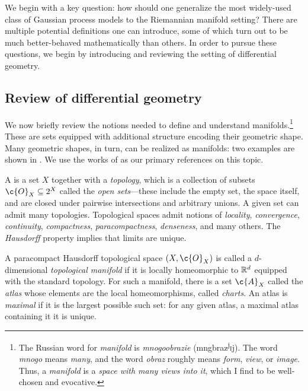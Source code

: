 \documentclass[11pt]{book}
\begin{document}
We begin with a key question: how should one generalize the most widely-used class of Gaussian process models to the Riemannian manifold setting?
There are multiple potential definitions one can introduce, some of which turn out to be much better-behaved mathematically than others.
In order to pursue these questions, we begin by introducing and reviewing the setting of differential geometry.

\subsection{Review of differential geometry}
We now briefly review the notions needed to define and understand manifolds.\footnote{The Russian word for \emph{manifold} is \emph{mnogoobrazie} (mngbr{\textquotesingle}az\textsuperscript{j}\textsc{i}j). The word \emph{mnogo} means \emph{many}, and the word \emph{obraz} roughly means \emph{form}, \emph{view}, or \emph{image}. 
Thus, a \emph{manifold} is a \emph{space with many views into it}, which I find to be well-chosen and evocative.}
These are sets equipped with additional structure encoding their geometric shape.
Many geometric shapes, in turn, can be realized as manifolds: two examples are shown in .
We use the works of \textcite{lee10,lee12,lee18} as our primary references on this topic.

A  is a set $X$ together with a \emph{topology}, which is a collection of subsets $\c{O}_X \subseteq 2^X$ called the \emph{open sets}---these include the empty set, the space itself, and are closed under pairwise intersections and arbitrary unions.
A given set can admit many topologies.
Topological spaces admit notions of \emph{locality}, \emph{convergence}, \emph{continuity}, \emph{compactness}, \emph{paracompactness}, \emph{denseness}, and many others.
The \emph{Hausdorff} property implies that limits are unique.

A paracompact Hausdorff topological space $(X,\c{O}_X)$ is called a $d$-dimensional \emph{topological manifold} if it is locally homeomorphic to $\mathbb{R}^d$ equipped with the standard topology.
For such a manifold, there is a set $\c{A}_X$ called the \emph{atlas} whose elements are the local homeomorphisms, called \emph{charts}.
An atlas is \emph{maximal} if it is the largest possible such set: for any given atlas, a maximal atlas containing it it is unique.
\end{document}
